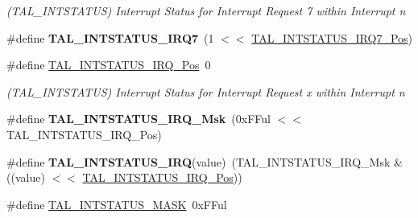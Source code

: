 \begin{DoxyCompactItemize}
\begin{DoxyCompactList}\small\item\em (T\+A\+L\+\_\+\+I\+N\+T\+S\+T\+A\+T\+U\+S) Interrupt Status for Interrupt Request 7 within Interrupt n \end{DoxyCompactList}\item 
\hypertarget{group___s_a_m_l21___t_a_l_gaec47c8f4cf746e2f13788e409c0d8222}{}\#define {\bfseries T\+A\+L\+\_\+\+I\+N\+T\+S\+T\+A\+T\+U\+S\+\_\+\+I\+R\+Q7}~(1 $<$$<$ \hyperlink{group___s_a_m_l21___t_a_l_ga9b599baae0a3a68405e6f8724eaa53c5}{T\+A\+L\+\_\+\+I\+N\+T\+S\+T\+A\+T\+U\+S\+\_\+\+I\+R\+Q7\+\_\+\+Pos})\label{group___s_a_m_l21___t_a_l_gaec47c8f4cf746e2f13788e409c0d8222}

\item 
\hypertarget{group___s_a_m_l21___t_a_l_ga9f1b75cdd82bf9560813a915219fd6e8}{}\#define \hyperlink{group___s_a_m_l21___t_a_l_ga9f1b75cdd82bf9560813a915219fd6e8}{T\+A\+L\+\_\+\+I\+N\+T\+S\+T\+A\+T\+U\+S\+\_\+\+I\+R\+Q\+\_\+\+Pos}~0\label{group___s_a_m_l21___t_a_l_ga9f1b75cdd82bf9560813a915219fd6e8}

\begin{DoxyCompactList}\small\item\em (T\+A\+L\+\_\+\+I\+N\+T\+S\+T\+A\+T\+U\+S) Interrupt Status for Interrupt Request x within Interrupt n \end{DoxyCompactList}\item 
\hypertarget{group___s_a_m_l21___t_a_l_ga563e5c517fc03d6785fc1cfe03cf1921}{}\#define {\bfseries T\+A\+L\+\_\+\+I\+N\+T\+S\+T\+A\+T\+U\+S\+\_\+\+I\+R\+Q\+\_\+\+Msk}~(0x\+F\+Ful $<$$<$ T\+A\+L\+\_\+\+I\+N\+T\+S\+T\+A\+T\+U\+S\+\_\+\+I\+R\+Q\+\_\+\+Pos)\label{group___s_a_m_l21___t_a_l_ga563e5c517fc03d6785fc1cfe03cf1921}

\item 
\hypertarget{group___s_a_m_l21___t_a_l_gaa76ff366f92bfbfc14b3165d930af40f}{}\#define {\bfseries T\+A\+L\+\_\+\+I\+N\+T\+S\+T\+A\+T\+U\+S\+\_\+\+I\+R\+Q}(value)~(T\+A\+L\+\_\+\+I\+N\+T\+S\+T\+A\+T\+U\+S\+\_\+\+I\+R\+Q\+\_\+\+Msk \& ((value) $<$$<$ \hyperlink{group___s_a_m_l21___t_a_l_ga9f1b75cdd82bf9560813a915219fd6e8}{T\+A\+L\+\_\+\+I\+N\+T\+S\+T\+A\+T\+U\+S\+\_\+\+I\+R\+Q\+\_\+\+Pos}))\label{group___s_a_m_l21___t_a_l_gaa76ff366f92bfbfc14b3165d930af40f}

\item 
\hypertarget{group___s_a_m_l21___t_a_l_ga23a0cfeb7c147f40525122e3aa06c737}{}\#define \hyperlink{group___s_a_m_l21___t_a_l_ga23a0cfeb7c147f40525122e3aa06c737}{T\+A\+L\+\_\+\+I\+N\+T\+S\+T\+A\+T\+U\+S\+\_\+\+M\+A\+S\+K}~0x\+F\+Ful\label{group___s_a_m_l21___t_a_l_ga23a0cfeb7c147f40525122e3aa06c737}


\end{DoxyCompactItemize}
